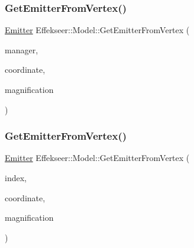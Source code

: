 \mbox{\label{class_effekseer_1_1_model_a3ae42d789d1d4cd2166505e8e574b3d5}} 
\subsubsection{\texorpdfstring{Get\+Emitter\+From\+Vertex()}{GetEmitterFromVertex()}\hspace{0.1cm}{\footnotesize\ttfamily [1/2]}}
{\footnotesize\ttfamily \mbox{\hyperlink{struct_effekseer_1_1_model_1_1_emitter}{Emitter}} Effekseer\+::\+Model\+::\+Get\+Emitter\+From\+Vertex (\begin{DoxyParamCaption}\item[{\mbox{\hyperlink{class_effekseer_1_1_manager}{Manager}} $\ast$}]{manager,  }\item[{\mbox{\hyperlink{namespace_effekseer_ac8508f8823c5fcf36aac5d2ddee23765}{Coordinate\+System}}}]{coordinate,  }\item[{float}]{magnification }\end{DoxyParamCaption})\hspace{0.3cm}{\ttfamily [inline]}}

\mbox{\label{class_effekseer_1_1_model_abe1b586ac7cab23902e05c76b6b02349}} 
\subsubsection{\texorpdfstring{Get\+Emitter\+From\+Vertex()}{GetEmitterFromVertex()}\hspace{0.1cm}{\footnotesize\ttfamily [2/2]}}
{\footnotesize\ttfamily \mbox{\hyperlink{struct_effekseer_1_1_model_1_1_emitter}{Emitter}} Effekseer\+::\+Model\+::\+Get\+Emitter\+From\+Vertex (\begin{DoxyParamCaption}\item[{int32\+\_\+t}]{index,  }\item[{\mbox{\hyperlink{namespace_effekseer_ac8508f8823c5fcf36aac5d2ddee23765}{Coordinate\+System}}}]{coordinate,  }\item[{float}]{magnification }\end{DoxyParamCaption})\hspace{0.3cm}{\ttfamily [inline]}}

